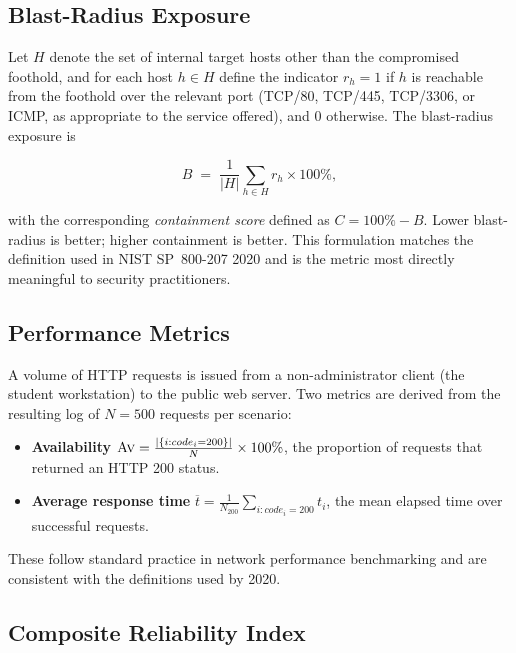\subsection{Blast-Radius Exposure}

Let $H$ denote the set of internal target hosts other than the compromised foothold, and for each host $h \in H$ define the indicator $r_h = 1$ if $h$ is reachable from the foothold over the relevant port (TCP/80, TCP/445, TCP/3306, or ICMP, as appropriate to the service offered), and $0$ otherwise. The blast-radius exposure is

\begin{equation}
B \;=\; \frac{1}{|H|}\sum_{h \in H} r_h \times 100\%,
\label{eq:blast}
\end{equation}

with the corresponding \emph{containment score} defined as $C = 100\% - B$. Lower blast-radius is better; higher containment is better. This formulation matches the definition used in NIST SP~800-207 \parencite{Rose et al.}{2020} and is the metric most directly meaningful to security practitioners.

\subsection{Performance Metrics}

A volume of HTTP requests is issued from a non-administrator client (the student workstation) to the public web server. Two metrics are derived from the resulting log of $N = 500$ requests per scenario:

\begin{itemize}[leftmargin=*]
    \item \textbf{Availability} $\textsc{Av} = \frac{|\{i : code_i = 200\}|}{N} \times 100\%$, the proportion of requests that returned an HTTP 200 status.
    \item \textbf{Average response time} $\overline{t} = \frac{1}{N_{200}}\sum_{i: code_i=200} t_i$, the mean elapsed time over successful requests.
\end{itemize}

These follow standard practice in network performance benchmarking and are consistent with the definitions used by \textcite{Stallings}{2020}.

\subsection{Composite Reliability Index}

